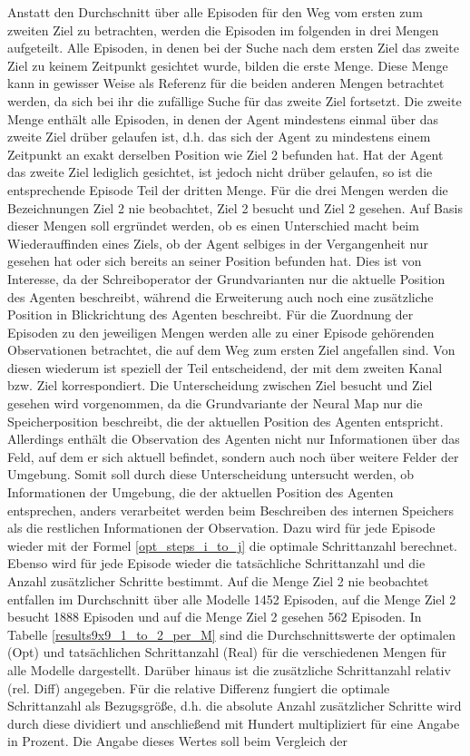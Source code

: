 Anstatt den Durchschnitt über alle Episoden für den Weg vom ersten zum zweiten Ziel zu betrachten, werden die Episoden im folgenden in drei Mengen aufgeteilt. Alle Episoden, in denen bei der Suche nach dem ersten Ziel das zweite Ziel zu keinem Zeitpunkt gesichtet wurde, bilden die erste Menge. Diese Menge kann in gewisser Weise als Referenz für die beiden anderen Mengen betrachtet werden, da sich bei ihr die zufällige Suche für das zweite Ziel fortsetzt. Die zweite Menge enthält alle Episoden, in denen der Agent mindestens einmal über das zweite Ziel drüber gelaufen ist, d.h. das sich der Agent zu mindestens einem Zeitpunkt an exakt derselben Position wie Ziel 2 befunden hat. Hat der Agent das zweite Ziel lediglich gesichtet, ist jedoch nicht drüber gelaufen, so ist die entsprechende Episode Teil der dritten Menge. Für die drei Mengen werden die Bezeichnungen \glqq Ziel 2 nie beobachtet\grqq{}, \glqq Ziel 2 besucht\grqq{} und \glqq Ziel 2 gesehen\grqq{}. Auf Basis dieser Mengen soll ergründet werden, ob es einen Unterschied macht beim Wiederauffinden eines Ziels, ob der Agent selbiges in der Vergangenheit nur gesehen hat oder sich bereits an seiner Position befunden hat. Dies ist von Interesse, da der Schreiboperator der Grundvarianten nur die aktuelle Position des Agenten beschreibt, während die Erweiterung auch noch eine zusätzliche Position in Blickrichtung des Agenten beschreibt. Für die Zuordnung der Episoden zu den jeweiligen Mengen werden alle zu einer Episode gehörenden Observationen betrachtet, die auf dem Weg zum ersten Ziel angefallen sind. Von diesen wiederum ist speziell der Teil entscheidend, der mit dem zweiten Kanal bzw. Ziel korrespondiert. Die Unterscheidung zwischen \glqq Ziel\grqq{} besucht und \glqq Ziel\grqq{} gesehen wird vorgenommen, da die Grundvariante der Neural Map nur die Speicherposition beschreibt, die der aktuellen Position des Agenten entspricht. Allerdings enthält die Observation des Agenten nicht nur Informationen über das Feld, auf dem er sich aktuell befindet, sondern auch noch über weitere Felder der Umgebung. Somit soll durch diese Unterscheidung untersucht werden, ob Informationen der Umgebung, die der aktuellen Position des Agenten entsprechen, anders verarbeitet werden beim Beschreiben des internen Speichers als die restlichen Informationen der Observation. Dazu wird für jede Episode wieder mit der Formel \ref{opt_steps_i_to_j} die optimale Schrittanzahl berechnet. Ebenso wird für jede Episode wieder die tatsächliche Schrittanzahl und die Anzahl zusätzlicher Schritte bestimmt. Auf die Menge \glqq Ziel 2 nie beobachtet\grqq{} entfallen im Durchschnitt über alle Modelle 1452 Episoden, auf die Menge \glqq Ziel 2 besucht\grqq{} 1888 Episoden und auf die Menge \glqq Ziel 2 gesehen\grqq{} 562 Episoden. In Tabelle \ref{results9x9_1_to_2_per_M} sind die Durchschnittswerte der optimalen (Opt) und tatsächlichen Schrittanzahl (Real) für die verschiedenen Mengen für alle Modelle dargestellt. Darüber hinaus ist die zusätzliche Schrittanzahl relativ (rel. Diff) angegeben. Für die relative Differenz fungiert die optimale Schrittanzahl als Bezugsgröße, d.h. die absolute Anzahl zusätzlicher Schritte wird durch diese dividiert und anschließend mit Hundert multipliziert für eine Angabe in Prozent. Die Angabe dieses Wertes soll beim Vergleich der 